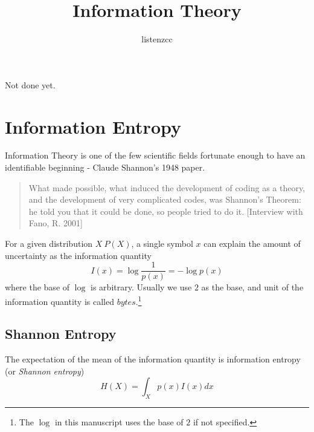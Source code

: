 \documentclass[a4paper]{article}
\title{Information Theory}
\author{listenzcc}
\begin{document}
\maketitle


\abstract
Not done yet.

\tableofcontents

\section{Information Entropy}
Information Theory is one of the few scientific fields fortunate enough to have an identifiable beginning - Claude Shannon's 1948 paper.
\begin{quote}
    What made possible, what induced the development of coding as a theory, and
    the development of very complicated codes, was Shannon's Theorem: he told
    you that it could be done, so people tried to do it.
        [Interview with Fano, R. 2001]
\end{quote}

For a given distribution $X ~ P(X)$, a single symbol $x$ can explain the amount of uncertainty as the information quantity
\begin{equation}
    I(x) = \log{\frac{1}{p(x)}} = - \log{p(x)}
    \label{eq: Information Quantity x}
\end{equation}
where the base of $\log{}$ is arbitrary. Usually we use $2$ as the base, and unit of the information quantity is called $bytes$.\footnote{The $\log{}$ in this manuscript uses the base of $2$ if not specified.}

\subsection{Shannon Entropy}
The expectation of the mean of the information quantity is information entropy (or \emph{Shannon entropy})
\begin{equation}
    H(X) = \int_{X} p(x) I(x) dx
    \label{eq: X}
\end{equation}
\end{document}
